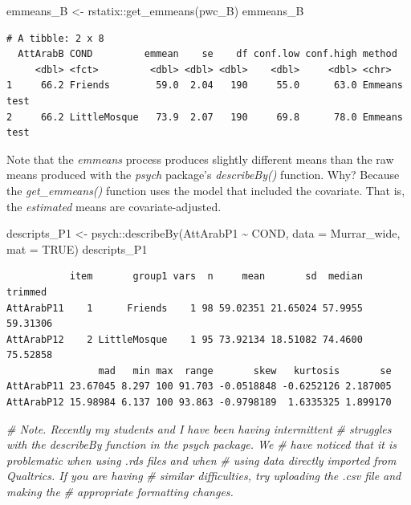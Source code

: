 \documentclass[
  11pt,
]{book}
\newenvironment{Shaded}{\begin{snugshade}}{\end{snugshade}}
\newcommand{\AttributeTok}[1]{\textcolor[rgb]{0.77,0.63,0.00}{#1}}
\newcommand{\CommentTok}[1]{\textcolor[rgb]{0.56,0.35,0.01}{\textit{#1}}}
\newcommand{\ConstantTok}[1]{\textcolor[rgb]{0.00,0.00,0.00}{#1}}
\newcommand{\FunctionTok}[1]{\textcolor[rgb]{0.00,0.00,0.00}{#1}}
\newcommand{\NormalTok}[1]{#1}
\newcommand{\OtherTok}[1]{\textcolor[rgb]{0.56,0.35,0.01}{#1}}
\newcommand{\SpecialCharTok}[1]{\textcolor[rgb]{0.00,0.00,0.00}{#1}}
\begin{document}
\begin{Shaded}
\begin{Highlighting}[]
\NormalTok{emmeans\_B }\OtherTok{\textless{}{-}}\NormalTok{ rstatix}\SpecialCharTok{::}\FunctionTok{get\_emmeans}\NormalTok{(pwc\_B)}
\NormalTok{emmeans\_B}
\end{Highlighting}
\end{Shaded}

\begin{verbatim}
# A tibble: 2 x 8
  AttArabB COND         emmean    se    df conf.low conf.high method      
     <dbl> <fct>         <dbl> <dbl> <dbl>    <dbl>     <dbl> <chr>       
1     66.2 Friends        59.0  2.04   190     55.0      63.0 Emmeans test
2     66.2 LittleMosque   73.9  2.07   190     69.8      78.0 Emmeans test
\end{verbatim}

Note that the \emph{emmeans} process produces slightly different means than the raw means produced with the \emph{psych} package's \emph{describeBy()} function. Why? Because the \emph{get\_emmeans()} function uses the model that included the covariate. That is, the \emph{estimated} means are covariate-adjusted.

\begin{Shaded}
\begin{Highlighting}[]
\NormalTok{descripts\_P1 }\OtherTok{\textless{}{-}}\NormalTok{ psych}\SpecialCharTok{::}\FunctionTok{describeBy}\NormalTok{(AttArabP1 }\SpecialCharTok{\textasciitilde{}}\NormalTok{ COND, }\AttributeTok{data =}\NormalTok{ Murrar\_wide,}
    \AttributeTok{mat =} \ConstantTok{TRUE}\NormalTok{)}
\NormalTok{descripts\_P1}
\end{Highlighting}
\end{Shaded}

\begin{verbatim}
           item       group1 vars  n     mean       sd  median  trimmed
AttArabP11    1      Friends    1 98 59.02351 21.65024 57.9955 59.31306
AttArabP12    2 LittleMosque    1 95 73.92134 18.51082 74.4600 75.52858
                mad   min max  range       skew   kurtosis       se
AttArabP11 23.67045 8.297 100 91.703 -0.0518848 -0.6252126 2.187005
AttArabP12 15.98984 6.137 100 93.863 -0.9798189  1.6335325 1.899170
\end{verbatim}

\begin{Shaded}
\begin{Highlighting}[]
\CommentTok{\# Note. Recently my students and I have been having intermittent}
\CommentTok{\# struggles with the describeBy function in the psych package. We}
\CommentTok{\# have noticed that it is problematic when using .rds files and when}
\CommentTok{\# using data directly imported from Qualtrics. If you are having}
\CommentTok{\# similar difficulties, try uploading the .csv file and making the}
\CommentTok{\# appropriate formatting changes.}
\end{Highlighting}
\end{Shaded}
\end{document}
